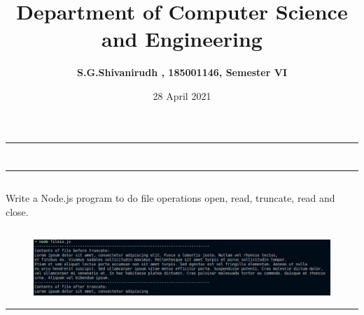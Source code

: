 \documentclass[12pt,letterpaper]{article}
\title{\textbf{Department of Computer Science and Engineering}}
\author{\textbf{S.G.Shivanirudh , 185001146, Semester VI }}
\date{28 April 2021}
\begin{document}
\maketitle
\hrule
\section*{}
\hrule 
\bigskip\bigskip

\subsection*{}

\subsection*{}
\begin{flushleft}
    Write a Node.js program to do file operations open, read, truncate, read and close.
\end{flushleft}

\subsection*{}

\subsubsection*{}
\begin{flushleft}

\end{flushleft}

\subsection*{}
\begin{figure}[h]
    \centering
    \includegraphics[width = \textwidth]{Pics/op.png}
\end{figure}

\hrule
\end{document}
